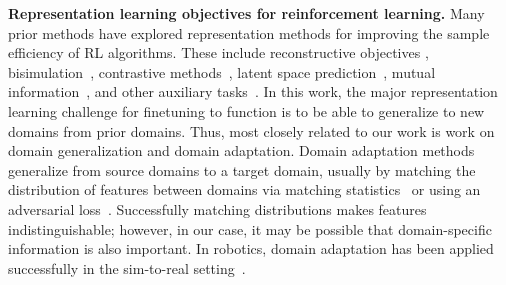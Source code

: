 \documentclass[letterpaper, 10 pt, conference, final]{ieeeconf}   %
\begin{document}
\textbf{Representation learning objectives for reinforcement learning.}
Many prior methods have explored representation methods for improving the sample efficiency of RL algorithms. These include reconstructive objectives \cite{lange2010deep, lange2012autonomous, finn2016deep}, bisimulation~\cite{ferns2004bisimulation, castro20bisimulation, zhang2021dbc}, contrastive methods~\cite{laskin2020curl, nguyen2021tpc}, latent space prediction~\cite{schwarzer2020spr}, mutual information~{}, and other auxiliary tasks~\cite{jonschkowski2017pve, ghosh2018learning, sax2018midlevel}.
In this work, the major representation learning challenge for finetuning to function is to be able to generalize to new domains from prior domains.
Thus, most closely related to our work is work on domain generalization and domain adaptation. Domain adaptation methods generalize from source domains to a target domain, usually by matching the distribution of features between domains via matching statistics~\cite{tzeng2014domainconfusion, sun2016coral, long2015adaptation} or using an adversarial loss~\cite{ganin2016domainadversarial, Bousmalis2016}.
Successfully matching distributions makes features indistinguishable; however, in our case, it may be possible that domain-specific information is also important.
In robotics, domain adaptation has been applied successfully in the sim-to-real setting~\cite{bousmalis2017simtoreal, james218simtosim}.
\end{document}
